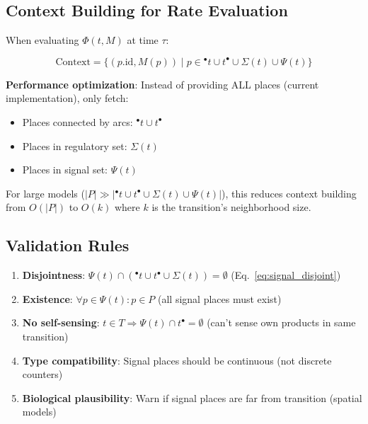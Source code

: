 \documentclass[11pt]{article}
\newcommand{\preset}[1]{{\ensuremath{^{\bullet}#1}}}
\newcommand{\postset}[1]{{\ensuremath{#1^{\bullet}}}}
\newcommand{\RegSet}[1]{{\Sigma(#1)}}
\newcommand{\SignalSet}[1]{{\Psi(#1)}}
\begin{document}
\subsection{Context Building for Rate Evaluation}

When evaluating $\Phi(t, M)$ at time $\tau$:

\begin{equation}
\text{Context} = \{(p.\text{id}, M(p)) \mid p \in \preset{t} \cup \postset{t} \cup \RegSet{t} \cup \SignalSet{t}\}
\end{equation}

\textbf{Performance optimization}: Instead of providing ALL places (current implementation), only fetch:
\begin{itemize}
    \item Places connected by arcs: $\preset{t} \cup \postset{t}$
    \item Places in regulatory set: $\RegSet{t}$
    \item Places in signal set: $\SignalSet{t}$
\end{itemize}

For large models ($|P| \gg |\preset{t} \cup \postset{t} \cup \RegSet{t} \cup \SignalSet{t}|$), this reduces context building from $O(|P|)$ to $O(k)$ where $k$ is the transition's neighborhood size.

\subsection{Validation Rules}

\begin{enumerate}
    \item \textbf{Disjointness}: $\SignalSet{t} \cap (\preset{t} \cup \postset{t} \cup \RegSet{t}) = \emptyset$ (Eq.~\ref{eq:signal_disjoint})
    
    \item \textbf{Existence}: $\forall p \in \SignalSet{t}: p \in P$ (all signal places must exist)
    
    \item \textbf{No self-sensing}: $t \in T \Rightarrow \SignalSet{t} \cap \postset{t} = \emptyset$ (can't sense own products in same transition)
    
    \item \textbf{Type compatibility}: Signal places should be continuous (not discrete counters)
    
    \item \textbf{Biological plausibility}: Warn if signal places are far from transition (spatial models)
\end{enumerate}
\end{document}
